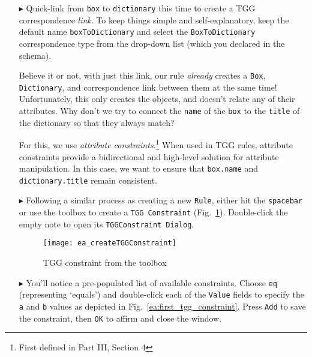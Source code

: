 \begin{enumerate}
\newpage

\item[$\blacktriangleright$] Quick-link from \texttt{box} to \texttt{dictionary} this time to create a TGG correspondence \emph{link}. To keep things simple and
self-explanatory, keep the default name \texttt{boxToDictionary} and select the \texttt{BoxToDictionary} correspondence type from the drop-down list (which you
declared in the schema).

\vspace{0.25cm}

Believe it or not, with just this link, our rule \emph{already} creates a \texttt{Box}, \texttt{Dictionary}, and correspondence link between them at the same
time! Unfortunately, this only creates the objects, and doesn't relate any of their attributes. Why don't we try to connect the \texttt{name} of the
\texttt{box} to the \texttt{title} of the dictionary so that they always match?

\vspace{0.25cm}

For this, we use \emph{attribute constraints}.\footnote{First defined in Part III, Section 4} When used in TGG rules, attribute constraints provide a
bidirectional and high-level solution for attribute manipulation. In this case, we want to ensure that \texttt{box.name} and \texttt{dictionary.title} remain
consistent.

\vspace{0.5cm}

\item[$\blacktriangleright$] Following a similar process as creating a new \texttt{Rule}, either hit the \texttt{spacebar} or use the toolbox to create a
\texttt{TGG Constraint} (Fig.~\ref{ea:common_toolbox}).  Double-click the empty note to open its \texttt{TGGConstraint Dialog}.

\vspace{0.5cm}

\begin{figure}[htbp]
\begin{center}
  \texttt{[image: ea\_createTGGConstraint]}
  \caption{TGG constraint from the toolbox}
  \label{ea:common_toolbox}
\end{center}
\end{figure}

\item[$\blacktriangleright$] You'll notice a pre-populated list of available constraints. Choose \texttt{eq} (representing `equals') and double-click each of
the \texttt{Value} fields to specify the \texttt{a} and \texttt{b} values as depicted in Fig.~\ref{ea:first_tgg_constraint}. Press \texttt{Add} to save the
constraint, then \texttt{OK} to affirm and close the window.


\end{enumerate}
